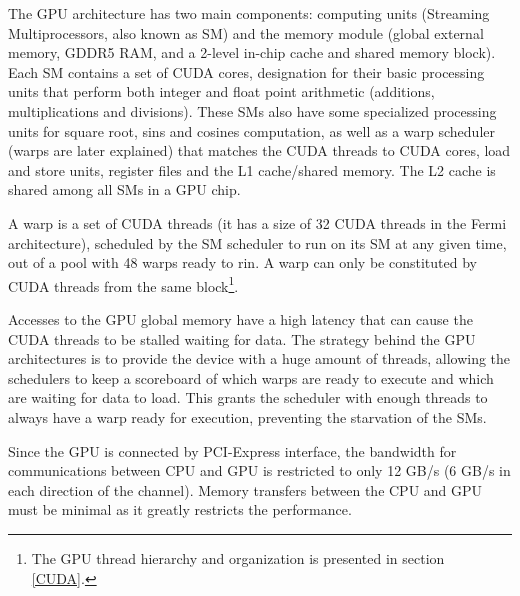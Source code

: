 The \nvidia GPU architecture has two main components: computing units (Streaming Multiprocessors, also known as SM) and the memory module (global external memory, GDDR5 RAM, and a 2-level in-chip cache and shared memory block). Each SM contains a set of CUDA cores, \nvidia designation for their basic processing units that perform both integer and float point arithmetic (additions, multiplications and divisions). These SMs also have some specialized processing units for square root, sins and cosines computation, as well as a warp scheduler (warps are later explained) that matches the CUDA threads to CUDA cores, load and store units, register files and the L1 cache/shared memory. The L2 cache is shared among all SMs in a GPU chip.

A warp is a set of CUDA threads (it has a size of 32 CUDA threads in the Fermi architecture), scheduled by the SM scheduler to run on its SM at any given time, out of a pool with 48 warps ready to rin. A warp can only be constituted by CUDA threads from the same block\footnote{The GPU thread hierarchy and organization is presented in section \ref{CUDA}.}.

Accesses to the GPU global memory have a high latency that can cause the CUDA threads to be stalled waiting for data. The strategy behind the GPU architectures is to provide the device with a huge amount of threads, allowing the schedulers to keep a scoreboard of which warps are ready to execute and which are waiting for data to load. This grants the scheduler with enough threads to always have a warp ready for execution, preventing the starvation of the SMs.

Since the GPU is connected by PCI-Express interface, the bandwidth for communications between CPU and GPU is restricted to only 12 GB/s (6 GB/s in each direction of the channel). Memory transfers between the CPU and GPU must be minimal as it greatly restricts the performance.

